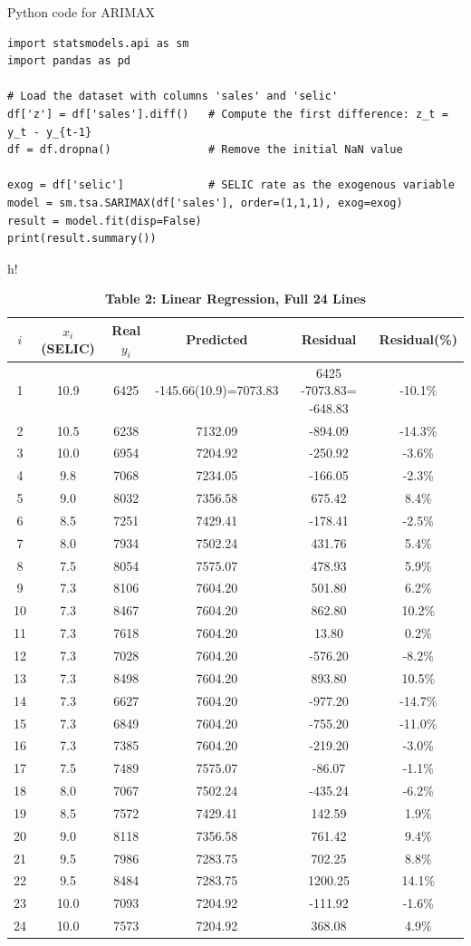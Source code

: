 \documentclass[10pt]{article}
\begin{document}
\begin{enumerate}
\item 
Python code for ARIMAX 
\begin{verbatim}
import statsmodels.api as sm
import pandas as pd

# Load the dataset with columns 'sales' and 'selic'
df['z'] = df['sales'].diff()   # Compute the first difference: z_t = y_t - y_{t-1}
df = df.dropna()               # Remove the initial NaN value

exog = df['selic']             # SELIC rate as the exogenous variable
model = sm.tsa.SARIMAX(df['sales'], order=(1,1,1), exog=exog)
result = model.fit(disp=False)
print(result.summary())
\end{verbatim}
\begin{table} \item [h!]\centering\caption{\textbf{Table 2: Linear Regression, Full 24 Lines}}
\label{tab:table2_linear_24}
\begin{tabular}{cccccc}
\toprule
$i$ & $x_i$ (SELIC) & Real $y_i$ & Predicted & Residual & Residual(\%) \\
\midrule
1 &10.9 &6425 &\;8661.52 -145.66(10.9)=7073.83 &6425 -7073.83= -648.83 & -10.1\%\\
2 &10.5 &6238 &7132.09 & -894.09 & -14.3\%\\
3 &10.0 &6954 &7204.92 & -250.92 & -3.6\%\\
4 &9.8  &7068 &7234.05 & -166.05 & -2.3\%\\
5 &9.0  &8032 &7356.58 & 675.42 & 8.4\%\\
6 &8.5  &7251 &7429.41 & -178.41 & -2.5\%\\
7 &8.0  &7934 &7502.24 & 431.76 & 5.4\%\\
8 &7.5  &8054 &7575.07 & 478.93 & 5.9\%\\
9 &7.3  &8106 &7604.20 & 501.80 & 6.2\%\\
10&7.3  &8467 &7604.20 & 862.80 & 10.2\%\\
11&7.3  &7618 &7604.20 & 13.80 & 0.2\%\\
12&7.3  &7028 &7604.20 & -576.20 & -8.2\%\\
13&7.3  &8498 &7604.20 & 893.80 & 10.5\%\\
14&7.3  &6627 &7604.20 & -977.20 & -14.7\%\\
15&7.3  &6849 &7604.20 & -755.20 & -11.0\%\\
16&7.3  &7385 &7604.20 & -219.20 & -3.0\%\\
17&7.5  &7489 &7575.07 & -86.07 & -1.1\%\\
18&8.0  &7067 &7502.24 & -435.24 & -6.2\%\\
19&8.5  &7572 &7429.41 & 142.59 & 1.9\%\\
20&9.0  &8118 &7356.58 & 761.42 & 9.4\%\\
21&9.5  &7986 &7283.75 & 702.25 & 8.8\%\\
22&9.5  &8484 &7283.75 &1200.25 &14.1\%\\
23&10.0 &7093 &7204.92 &-111.92 & -1.6\%\\
24&10.0 &7573 &7204.92 & 368.08 & 4.9\%\\
\bottomrule
\end{tabular}
\end{table}


\end{enumerate}
\end{document}
